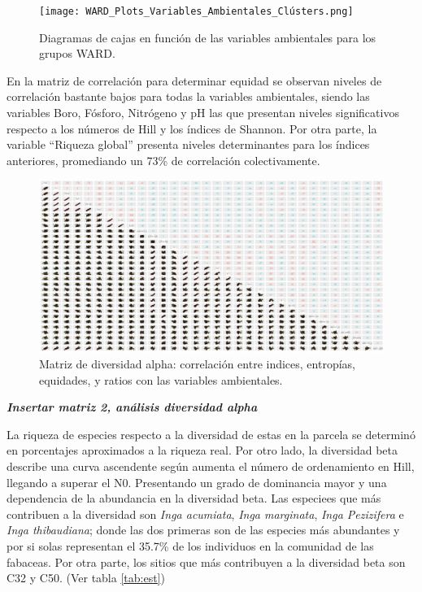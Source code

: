 \documentclass[11pt,]{article}
\begin{document}
\begin{figure}
\centering
\texttt{[image: WARD\_Plots\_Variables\_Ambientales\_Clústers.png]}
\caption{Diagramas de cajas en función de las variables ambientales para
los grupos WARD.\label{fig:boxW}}
\end{figure}

En la matriz de correlación para determinar equidad se observan niveles
de correlación bastante bajos para todas la variables ambientales,
siendo las variables Boro, Fósforo, Nitrógeno y pH las que presentan
niveles significativos respecto a los números de Hill y los índices de
Shannon. Por otra parte, la variable ``Riqueza global'' presenta niveles
determinantes para los índices anteriores, promediando un 73\% de
correlación colectivamente.

\begin{figure}
\centering
\includegraphics[width=1.00000\textwidth]{Análisis/Diversidad/Índices_Env_Diversidad_Alpha_2.png}
\caption{Matriz de diversidad alpha: correlación entre indices,
entropías, equidades, y ratios con las variables
ambientales.\label{fig:divA}}
\end{figure}

\textbf{\emph{Insertar matriz 2, análisis diversidad alpha}}

La riqueza de especies respecto a la diversidad de estas en la parcela
se determinó en porcentajes aproximados a la riqueza real. Por otro
lado, la diversidad beta describe una curva ascendente según aumenta el
número de ordenamiento en Hill, llegando a superar el N0. Presentando un
grado de dominancia mayor y una dependencia de la abundancia en la
diversidad beta. Las especiees que más contribuen a la diversidad son
\emph{Inga acumiata}, \emph{Inga marginata}, \emph{Inga Pezizifera} e
\emph{Inga thibaudiana}; donde las dos primeras son de las especies más
abundantes y por si solas representan el 35.7\% de los individuos en la
comunidad de las fabaceas. Por otra parte, los sitios que más
contribuyen a la diversidad beta son C32 y C50. (Ver tabla
\ref{tab:est})
\end{document}
